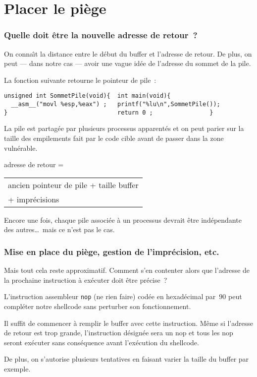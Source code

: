 \section{Placer le pi\`ege}
\begin{frame}[fragile]
  \frametitle{Quelle doit \^etre la nouvelle adresse de retour~?}%
  On conna\^\i{}t la distance entre le d\'ebut du buffer et l'adresse
  de retour. De plus, on peut --- dans notre cas --- avoir une vague
  id\'ee de l'adresse du sommet de la pile.
  \par
  La fonction suivante retourne le pointeur de pile~:
\begin{verbatim}
unsigned int SommetPile(void){  int main(void){             
  __asm__("movl %esp,%eax") ;   printf("%lu\n",SommetPile()); 
}                               return 0 ;                }
  \end{verbatim}
  \par
  La pile est partag\'ee par plusieurs processus apparent\'es et on peut parier 
  sur la taille des empilements fait par le code cible avant de passer dans la 
  zone vuln\'erable.
  \par
  adresse de retour = 
  \begin{tabular}[t]{l}
  ancien pointeur de pile + taille buffer \\ \mbox{}+ impr\'ecisions
  \end{tabular}
  \par
  Encore une fois, chaque pile associ\'ee \`a un processus devrait
  \^etre ind\'ependante des autres\ldots\ mais ce n'est pas le cas.
\end{frame}
\begin{frame}
  \frametitle{Mise en place du pi\`ege,  gestion de l'impr\'ecision, etc. }%
  Mais tout cela reste approximatif. Comment s'en contenter alors que
  l'adresse de la prochaine instruction \`a ex\'ecuter doit
  \^etre pr\'ecise~?
  \par\bigskip
  L'instruction assembleur \texttt{nop} (ne rien faire) cod\'ee en
  hexad\'ecimal par~$90$ peut compl\'eter notre shellcode sans
  perturber son fonctionnement.
  \par\bigskip
  Il suffit de commencer \`a remplir le buffer avec cette instruction.
  M\^eme si l'adresse de retour est trop grande, l'instruction
  d\'esign\'ee sera un nop et tous les nop seront ex\'ecuter sans
  cons\'equence avant l'ex\'ecution du shellcode.
  \par\bigskip
  De plus, on s'autorise plusieurs tentatives en faisant varier la
  taille du buffer par exemple.
\end{frame}

